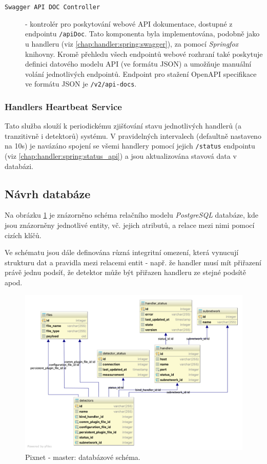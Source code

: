 \begin{description}
    \item[\texttt{Swagger API DOC Controller}] - kontrolér pro poskytování webové API dokumentace, dostupné z endpointu \texttt{/apiDoc}. Tato komponenta byla implementována, podobně jako u handleru (viz \ref{chap:handler:spring:swagger}), za pomocí \textit{Springfox} \cite{springfox} knihovny. Kromě přehledu všech endpointů webové rozhraní také poskytuje definici datového modelu API (ve formátu JSON) a umožňuje manuální volání jednotlivých endpointů. Endpoint pro stažení Open\-API specifikace ve formátu JSON je \texttt{/v2/api-docs}.
\end{description}

\subsubsection{Handlers Heartbeat Service}
Tato služba slouží k periodickému zjišťování stavu jednotlivých handlerů (a tranzitivně i detektorů) systému. V pravidelných intervalech (defaultně nastaveno na \unit{10}{s}) je navázáno spojení se všemi handlery pomocí jejich \texttt{/status} endpointu (viz \ref{chap:handler:spring:status_api}) a jsou aktualizována stavová data v databázi.

\subsection{Návrh databáze}\label{chap:master:backend:db}
Na obrázku \ref{fig:master:db_schema} je znázorněno schéma relačního modelu \textit{PostgreSQL} databáze, kde jsou znázorněny jednotlivé entity, vč. jejich atributů, a relace mezi nimi pomocí cizích klíčů.

Ve schématu jsou dále definována různá integritní omezení, která vynucují strukturu dat a pravidla mezi relacemi entit - např. že handler musí mít přiřazení právě jednu podsíť, že detektor může být přiřazen handleru ze stejné podsítě apod.

\begin{figure}[h]
	\begin{center}
		\vspace*{0.4cm}
		\includegraphics[width=15cm]{figures/master_db.png}
		\caption{Pixnet - master: databázové schéma.}
		\label{fig:master:db_schema}
	\end{center}
\end{figure}

